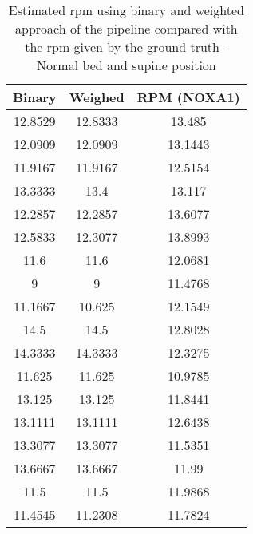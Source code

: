 \begin{table}[h]
    \centering
    \begin{tabular}{|c|c|c|}
 
    \hline 
    Binary & Weighed & RPM (NOXA1) \\ 
    \hline 
    12.8529  & 12.8333  & 13.485  \\ 
    12.0909  & 12.0909  & 13.1443  \\ 
    11.9167  & 11.9167  & 12.5154  \\ 
    13.3333  & 13.4  & 13.117  \\ 
    12.2857  & 12.2857  & 13.6077 \\ 
    12.5833  & 12.3077  & 13.8993 \\ 
    11.6  & 11.6 & 12.0681  \\ 
    9 &  9  & 11.4768  \\ 
    11.1667  & 10.625  & 12.1549  \\ 
    14.5 & 14.5  & 12.8028 \\ 
    14.3333  & 14.3333  & 12.3275  \\ 
    11.625  & 11.625  & 10.9785  \\ 
    13.125  & 13.125  & 11.8441  \\ 
    13.1111  & 13.1111  & 12.6438  \\ 
    13.3077  & 13.3077  & 11.5351  \\ 
    13.6667  & 13.6667  & 11.99  \\ 
    11.5  & 11.5  & 11.9868 \\ 
    11.4545  & 11.2308  & 11.7824 \\ 
    \hline 
\end{tabular}
\caption{Estimated rpm using binary and weighted approach of the pipeline
compared with the rpm given by the ground truth
- Normal bed and supine position}
\label{tab:SupineNormalStillsg}

\end{table}